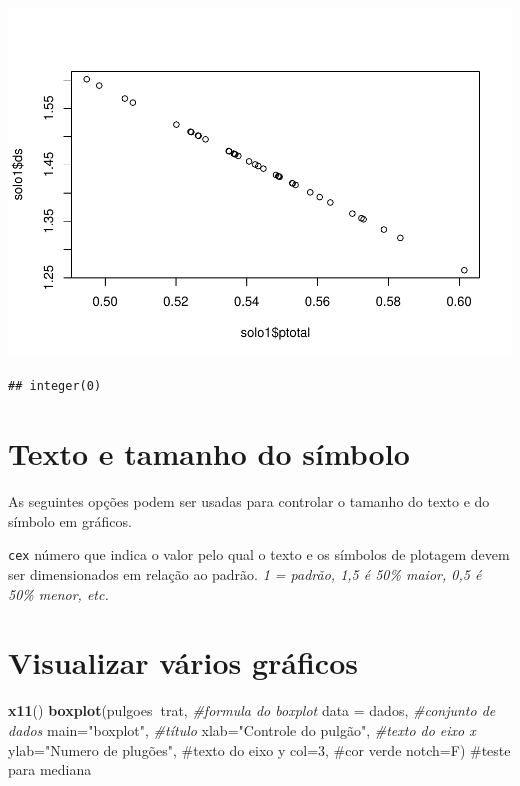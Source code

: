 \documentclass[
]{book}
\newenvironment{Shaded}{\begin{snugshade}}{\end{snugshade}}
\newcommand{\CommentTok}[1]{\textcolor[rgb]{0.56,0.35,0.01}{\textit{#1}}}
\newcommand{\DataTypeTok}[1]{\textcolor[rgb]{0.13,0.29,0.53}{#1}}
\newcommand{\KeywordTok}[1]{\textcolor[rgb]{0.13,0.29,0.53}{\textbf{#1}}}
\newcommand{\NormalTok}[1]{#1}
\newcommand{\OperatorTok}[1]{\textcolor[rgb]{0.81,0.36,0.00}{\textbf{#1}}}
\newcommand{\StringTok}[1]{\textcolor[rgb]{0.31,0.60,0.02}{#1}}
\begin{document}
\includegraphics{TudodoR_files/figure-latex/unnamed-chunk-177-1.pdf}

\begin{verbatim}
## integer(0)
\end{verbatim}

\hypertarget{texto-e-tamanho-do-suxedmbolo}{%
\section{Texto e tamanho do símbolo}\label{texto-e-tamanho-do-suxedmbolo}}

As seguintes opções podem ser usadas para controlar o tamanho do texto e do símbolo em gráficos.

\texttt{cex} número que indica o valor pelo qual o texto e os símbolos de plotagem devem ser dimensionados em relação ao padrão.
\emph{1 = padrão, 1,5 é 50\% maior, 0,5 é 50\% menor, etc.}

\hypertarget{visualizar-vuxe1rios-gruxe1ficos}{%
\section{Visualizar vários gráficos}\label{visualizar-vuxe1rios-gruxe1ficos}}

\begin{Shaded}
\begin{Highlighting}[]
\KeywordTok{x11}\NormalTok{()}
\KeywordTok{boxplot}\NormalTok{(pulgoes}\OperatorTok{~}\NormalTok{trat,              }\CommentTok{#formula do boxplot}
        \DataTypeTok{data =}\NormalTok{ dados,              }\CommentTok{#conjunto de dados}
        \DataTypeTok{main=}\StringTok{"boxplot"}\NormalTok{,            }\CommentTok{#título}
        \DataTypeTok{xlab=}\StringTok{"Controle do pulgão"}\NormalTok{, }\CommentTok{#texto do eixo x }
        \DataTypeTok{ylab=}\StringTok{"Numero de plugões",  #texto do eixo y}
\StringTok{        col=3,                     #cor verde  }
\StringTok{        notch=F)                   #teste para mediana}
\end{Highlighting}
\end{Shaded}
\end{document}
